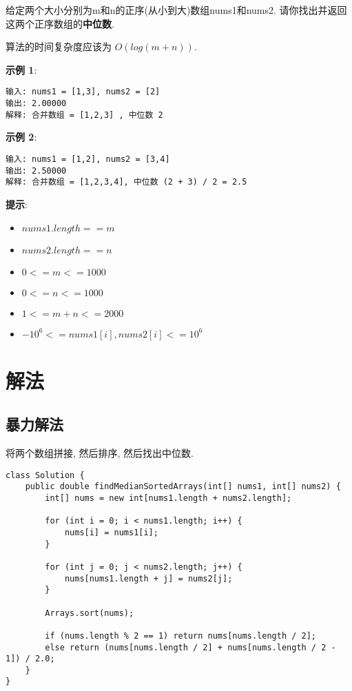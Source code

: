 \documentclass[oneside]{ctexbook}
\begin{document}
给定两个大小分别为m和n的正序(从小到大)数组nums1和nums2. 请你找出并返回这两个正序数组的\textbf{中位数}.

算法的时间复杂度应该为 $O(log(m+n))$.

\textbf{示例 1}:

\begin{verbatim}
输入: nums1 = [1,3], nums2 = [2]
输出: 2.00000
解释: 合并数组 = [1,2,3] , 中位数 2
\end{verbatim}

\textbf{示例 2}:

\begin{verbatim}
输入: nums1 = [1,2], nums2 = [3,4]
输出: 2.50000
解释: 合并数组 = [1,2,3,4], 中位数 (2 + 3) / 2 = 2.5
\end{verbatim}

\textbf{提示}:

\begin{itemize}
    \item $nums1.length == m$
    \item $nums2.length == n$
    \item $0 <= m <= 1000$
    \item $0 <= n <= 1000$
    \item $1 <= m + n <= 2000$
    \item $-10^6 <= nums1[i], nums2[i] <= 10^6$
\end{itemize}

\section{解法}

\subsection{暴力解法}

将两个数组拼接, 然后排序, 然后找出中位数.

\begin{verbatim}
class Solution {
    public double findMedianSortedArrays(int[] nums1, int[] nums2) {
        int[] nums = new int[nums1.length + nums2.length];

        for (int i = 0; i < nums1.length; i++) {
            nums[i] = nums1[i];
        }

        for (int j = 0; j < nums2.length; j++) {
            nums[nums1.length + j] = nums2[j];
        }

        Arrays.sort(nums);

        if (nums.length % 2 == 1) return nums[nums.length / 2];
        else return (nums[nums.length / 2] + nums[nums.length / 2 - 1]) / 2.0;
    }
}
\end{verbatim}
\end{document}
